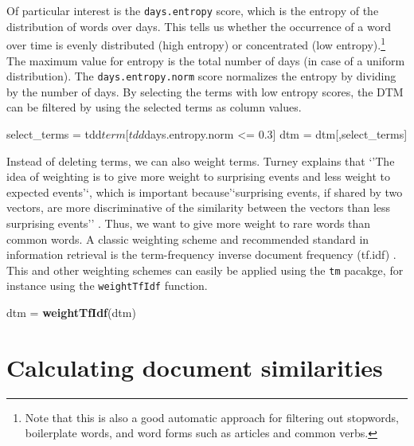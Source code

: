 \documentclass[]{article}
\newenvironment{Shaded}{\begin{snugshade}}{\end{snugshade}}
\newcommand{\KeywordTok}[1]{\textcolor[rgb]{0.13,0.29,0.53}{\textbf{{#1}}}}
\newcommand{\FloatTok}[1]{\textcolor[rgb]{0.00,0.00,0.81}{{#1}}}
\newcommand{\StringTok}[1]{\textcolor[rgb]{0.31,0.60,0.02}{{#1}}}
\newcommand{\NormalTok}[1]{{#1}}
\let\rmarkdownfootnote\footnote%
\def\footnote{\protect\rmarkdownfootnote}
\begin{document}
Of particular interest is the \texttt{days.entropy} score, which is the
entropy of the distribution of words over days. This tells us whether
the occurrence of a word over time is evenly distributed (high entropy)
or concentrated (low entropy).\footnote{Note that this is also a good
  automatic approach for filtering out stopwords, boilerplate words, and
  word forms such as articles and common verbs.} The maximum value for
entropy is the total number of days (in case of a uniform distribution).
The \texttt{days.entropy.norm} score normalizes the entropy by dividing
by the number of days. By selecting the terms with low entropy scores,
the DTM can be filtered by using the selected terms as column values.

\begin{Shaded}
\begin{Highlighting}[]
\NormalTok{select_terms =}\StringTok{ }\NormalTok{tdd$term[tdd$days.entropy.norm <=}\StringTok{ }\FloatTok{0.3}\NormalTok{]}
\NormalTok{dtm =}\StringTok{ }\NormalTok{dtm[,select_terms]}
\end{Highlighting}
\end{Shaded}

Instead of deleting terms, we can also weight terms. Turney explains
that `'The idea of weighting is to give more weight to surprising events
and less weight to expected events'`, which is important
because'`surprising events, if shared by two vectors, are more
discriminative of the similarity between the vectors than less
surprising events'' \citep[156]{turney02}. Thus, we want to give more
weight to rare words than common words. A classic weighting scheme and
recommended standard in information retrieval is the term-frequency
inverse document frequency (tf.idf) \citep[\citet{monroe08}]{sparck72}.
This and other weighting schemes can easily be applied using the
\texttt{tm} pacakge, for instance using the \texttt{weightTfIdf}
function.

\begin{Shaded}
\begin{Highlighting}[]
\NormalTok{dtm =}\StringTok{ }\KeywordTok{weightTfIdf}\NormalTok{(dtm)}
\end{Highlighting}
\end{Shaded}

\section{Calculating document
similarities}\label{calculating-document-similarities}
\end{document}
